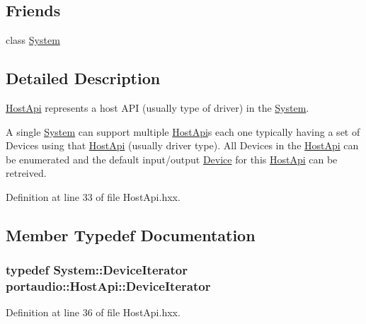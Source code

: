\subsection*{Friends}
\begin{DoxyCompactItemize}
\item 
class \hyperlink{classportaudio_1_1_host_api_af18a9ee98e70982bfe2975391d7221a5}{System}
\end{DoxyCompactItemize}


\subsection{Detailed Description}
\hyperlink{classportaudio_1_1_host_api}{Host\+Api} represents a host A\+PI (usually type of driver) in the \hyperlink{classportaudio_1_1_system}{System}. 

A single \hyperlink{classportaudio_1_1_system}{System} can support multiple \hyperlink{classportaudio_1_1_host_api}{Host\+Api}\textquotesingle{}s each one typically having a set of Devices using that \hyperlink{classportaudio_1_1_host_api}{Host\+Api} (usually driver type). All Devices in the \hyperlink{classportaudio_1_1_host_api}{Host\+Api} can be enumerated and the default input/output \hyperlink{classportaudio_1_1_device}{Device} for this \hyperlink{classportaudio_1_1_host_api}{Host\+Api} can be retreived. 

Definition at line 33 of file Host\+Api.\+hxx.



\subsection{Member Typedef Documentation}
\subsubsection[{\texorpdfstring{Device\+Iterator}{DeviceIterator}}]{\setlength{\rightskip}{0pt plus 5cm}typedef {\bf System\+::\+Device\+Iterator} {\bf portaudio\+::\+Host\+Api\+::\+Device\+Iterator}}\hypertarget{classportaudio_1_1_host_api_a17aa38607ee48a62d953550754dc4753}{}\label{classportaudio_1_1_host_api_a17aa38607ee48a62d953550754dc4753}


Definition at line 36 of file Host\+Api.\+hxx.



